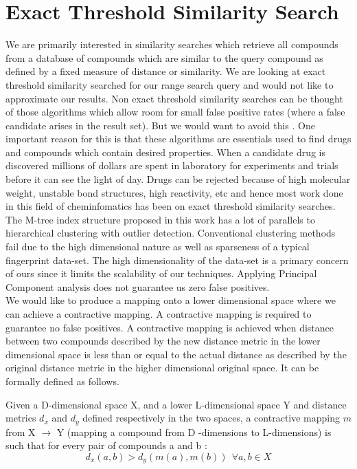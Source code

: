 \section{Exact Threshold Similarity Search}
\label{exact}
We are primarily interested in similarity searches which retrieve all compounds from a database of compounds which are similar to the query compound as defined by a fixed measure of distance or similarity. We are looking at exact threshold similarity searched for our range search query and would not like to approximate our results. Non exact threshold similarity searches can be thought of those algorithms which allow room for small false positive rates (where a false candidate arises in the result set). But we would want to avoid this . One important reason for this is that these algorithms are essentials used to find drugs and compounds which contain desired properties. When a candidate drug is discovered millions of dollars are spent in laboratory for experiments and trials before it can see the light of day. Drugs can be rejected because of high molecular weight, unstable bond structures, high reactivity, etc and hence most work done in this field of cheminfomatics has been on exact threshold similarity searches.\\

The M-tree index structure proposed in this work has a lot of parallels to hierarchical clustering with outlier detection. Conventional clustering methods fail due to the high dimensional nature as well as sparseness of a typical fingerprint data-set. The high dimensionality of the data-set is a primary concern of ours since it limits the scalability of our techniques. Applying Principal Component analysis does not guarantee us zero false positives. \\

We would like to produce a mapping onto a lower dimensional space where we can achieve a contractive mapping. A contractive mapping is required to guarantee no false positives. A contractive mapping is achieved when distance between two compounds described by the new distance metric in the lower dimensional space is less than or equal to the actual distance as described by the original distance metric in the higher dimensional original space. It can be formally defined as follows.\\

\begin{dfn}
 Given a D-dimensional space X, and a lower L-dimensional space Y and distance metrics $d_x$ and $d_y$ defined respectively in the two spaces, a contractive mapping $m$ from X $\rightarrow$ Y (mapping a compound from D -dimensions to L-dimensions) is such that for every pair of compounds a and b : \\
\begin{equation}
  d_x(a,b) > d_y(m(a),m(b))~~ \forall a,b \in X 
\end{equation}
\end{dfn}

